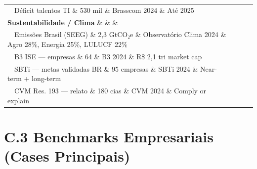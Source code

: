 \begin{longtable}{p{4cm}p{3cm}p{3cm}p{5cm}}
\ \ Déficit talentos TI \& 530 mil \& Brasscom 2024 \& Até 2025\\
\textbf{Sustentabilidade / Clima} \&  \&  \& \\
\ \ Emissões Brasil (SEEG) \& 2,3 GtCO₂e \& Observatório Clima 2024 \& Agro 28\%, Energia 25\%, LULUCF 22\% \\
\ \ B3 ISE — empresas \& 64 \& B3 2024 \& R\$ 2,1 tri market cap\\
\ \ SBTi — metas validadas BR \& 95 empresas \& SBTi 2024 \& Near-term + long-term\\
\ \ CVM Res. 193 — relato \& 180 cias \& CVM 2024 \& Comply or explain\\
\end{longtable}

\section*{C.3 Benchmarks Empresariais (Cases Principais)}

